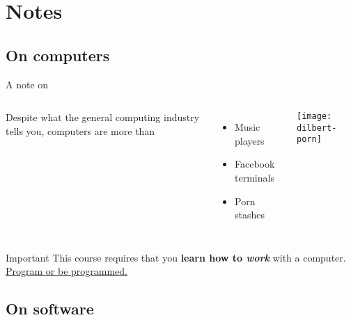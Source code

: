 \documentclass[t]{beamer}
\begin{document}
  
  \section{Notes}
  
  \subsection{On computers}

  \begin{frame}[t]{A note on }
  
    \begin{columns}[T]

      
      Despite what the general computing industry tells you, %
			computers are more than\\[1em]   

      \begin{itemize}
        \item Music players
        \item Facebook terminals
        \item Porn stashes
      \end{itemize}


      \texttt{[image: dilbert-porn]}

    \end{columns}
  
      \vspace{1em}
      
      \begin{alertblock}{Important}
        This course requires that you \textbf{learn how to \emph{work}} with a computer. %
          \href{http://www.orbooks.com/catalog/program/}{Program or be programmed.}
      \end{alertblock}
      
  \end{frame}


  \subsection{On software}
\end{document}
